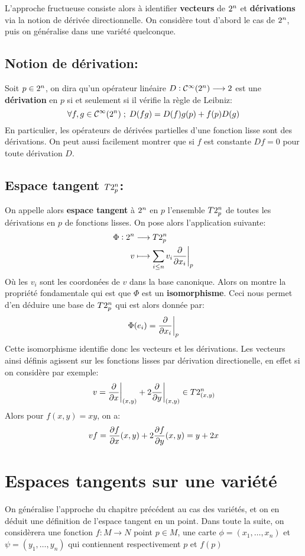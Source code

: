    L'approche fructueuse consiste alors à identifier \textbf{vecteurs} de \( 2^n \) et \textbf{dérivations} via la notion de dérivée directionnelle. On considère tout d'abord le cas de \( 2^n \), puis on généralise dans une variété quelconque.
   \section{Notion de dérivation:}
      Soit \(p \in 2^n\), on dira qu'un opérateur linéaire \( D: \mathcal{C}^\infty(2^n) \longrightarrow 2 \) est une \textbf{dérivation} en \( p \) si et seulement si il vérifie la règle de Leibniz:
      \[ 
         \forall f, g \in \mathcal{C}^\infty(2^n) \; ; \; D(fg) = D(f)g(p) + f(p)D(g) 
      \]
      En particulier, les opérateurs de dérivées partielles d'une fonction lisse sont des dérivations. On peut aussi facilement montrer que si \( f \) est constante \( Df = 0 \) pour toute dérivation \( D \).
   \section{Espace tangent \( T2^n_p \):}
      On appelle alors \textbf{espace tangent} à \( 2^n \) en \( p \) l'ensemble \( T2^n_p \) de toutes les dérivations en \( p \) de fonctions lisses. On pose alors l'application suivante:
      \[ 
         \begin{aligned}
            \Phi : 2^n &\longrightarrow T2^n_p \\
            v &\longmapsto \sum_{i \leq n} v_i \frac{\partial }{\partial x_i}\biggr|_p
         \end{aligned} 
      \]
      Où les \( v_i \) sont les coordonées de \( v \) dans la base canonique. Alors on montre la propriété fondamentale qui est que \( \Phi \) est un \textbf{isomorphisme}. Ceci nous permet d'en déduire une base de \( T2^n_p \) qui est alors donnée par:
      \[ 
         \Phi(e_i) = \frac{\partial }{\partial x_i}\biggr|_p
      \] 
      Cette isomorphisme identifie donc les vecteurs et les dérivations. Les vecteurs ainsi définis agissent sur les fonctions lisses par dérivation directionelle, en effet si on considère par exemple:
      \[ 
         v = \frac{\partial }{\partial x}\bigg|_{(x, y)} + 2\frac{\partial }{\partial y}\bigg|_{(x, y)} \in T2^n_{(x, y)}
      \] 
      Alors pour \( f(x, y) = xy \), on a:
      \[ 
         vf = \frac{\partial f}{\partial x}(x, y) + 2\frac{\partial f}{\partial y}(x, y) = y + 2x
      \]
\chapter{Espaces tangents sur une variété}
   On généralise l'approche du chapitre précédent au cas des variétés, et on en déduit une définition de l'espace tangent en un point. Dans toute la suite, on considèrera une fonction \( f : M \longrightarrow N \) point \( p \in M \), une carte \( \phi = (x_1, \ldots, x_n) \) et \( \psi = (y_1, \ldots, y_n) \) qui contiennent respectivement \( p \) et \( f(p) \)
